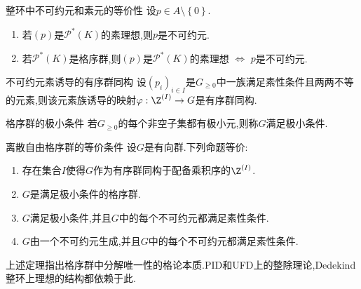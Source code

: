 \begin{proposition}{整环中不可约元和素元的等价性}{}
	设$p\in A\setminus\left\{0\right\}$.
	\begin{enumerate}
		\item 若$\left(p\right)$是$\mathscr{P}^{\ast}\left(K\right)$的素理想,则$p$是不可约元.
		\item 若$\mathscr{P}^{\ast}\left(K\right)$是格序群,则$\left(p\right)$是$\mathscr{P}^{\ast}\left(K\right)$的素理想 $\iff$ $p$是不可约元.
	\end{enumerate}
\end{proposition}

\begin{proposition}{不可约元素诱导的有序群同构}{}
	设$\left(p_{i}\right)_{i\in I}$是$G_{\geqslant 0}$中一族满足素性条件且两两不等的元素,则该元素族诱导的映射$\varphi:\Z^{\left(I\right)}\to G$是有序群同构.
\end{proposition}

\begin{definition}{格序群的极小条件}{}
	若$G_{\geqslant 0}$的每个非空子集都有极小元,则称$G$满足极小条件.
\end{definition}

\begin{theorem}{离散自由格序群的等价条件}{}
	设$G$是有向群.下列命题等价:
	\begin{enumerate}
		\item 存在集合$I$使得$G$作为有序群同构于配备乘积序的$\Z^{\left(I\right)}$.
		\item $G$是满足极小条件的格序群.
		\item $G$满足极小条件,并且$G$中的每个不可约元都满足素性条件.
		\item $G$由一个不可约元生成,并且$G$中的每个不可约元都满足素性条件.
	\end{enumerate}
\end{theorem}

\begin{remark}{}{}
	上述定理指出格序群中分解唯一性的格论本质.PID和UFD上的整除理论,Dedekind整环上理想的结构都依赖于此.
\end{remark}